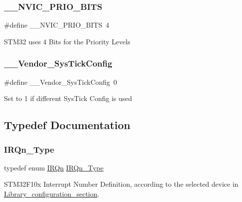 \subsubsection{\texorpdfstring{\_\_NVIC\_PRIO\_BITS}{\_\_NVIC\_PRIO\_BITS}}
{\footnotesize\ttfamily \#define \+\_\+\+\_\+\+N\+V\+I\+C\+\_\+\+P\+R\+I\+O\+\_\+\+B\+I\+TS~4}

S\+T\+M32 uses 4 Bits for the Priority Levels \mbox{\label{group___configuration__section__for___c_m_s_i_s_gab58771b4ec03f9bdddc84770f7c95c68}} 
\subsubsection{\texorpdfstring{\_\_Vendor\_SysTickConfig}{\_\_Vendor\_SysTickConfig}}
{\footnotesize\ttfamily \#define \+\_\+\+\_\+\+Vendor\+\_\+\+Sys\+Tick\+Config~0}

Set to 1 if different Sys\+Tick Config is used 

\subsection{Typedef Documentation}
\mbox{\label{group___configuration__section__for___c_m_s_i_s_gac3af4a32370fb28c4ade8bf2add80251}} 
\subsubsection{\texorpdfstring{IRQn\_Type}{IRQn\_Type}}
{\footnotesize\ttfamily typedef enum \mbox{\hyperlink{group___configuration__section__for___c_m_s_i_s_ga666eb0caeb12ec0e281415592ae89083}{I\+R\+Qn}}  \mbox{\hyperlink{group___configuration__section__for___c_m_s_i_s_gac3af4a32370fb28c4ade8bf2add80251}{I\+R\+Qn\+\_\+\+Type}}}



S\+T\+M32\+F10x Interrupt Number Definition, according to the selected device in \mbox{\hyperlink{group___library__configuration__section}{Library\+\_\+configuration\+\_\+section}}. 



